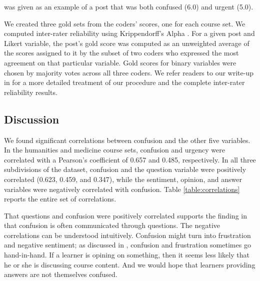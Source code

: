 \documentclass{edm_template}
\begin{document}
was given as an example of a post that was both confused (6.0) and urgent (5.0).

We created three gold sets from the coders' scores, one for each course set. We computed inter-rater reliability using Krippendorff's Alpha \cite{hayes2007answering}. For a given post and Likert variable, the post's gold score was computed as an unweighted average of the scores assigned to it by the subset of two coders who expressed the most agreement on that particular variable. Gold scores for binary variables were chosen by majority votes across all three coders. We refer readers to our write-up in \cite{stanfordMOOCPosts} for a more detailed treatment of our procedure and the complete inter-rater reliability results.


\subsection{Discussion}
We found significant correlations between confusion and the other five variables. In the humanities and medicine course sets, confusion and urgency were correlated with a Pearson's coefficient of 0.657 and 0.485, respectively. In all three subdivisions of the dataset, confusion and the question variable were positively correlated (0.623, 0.459, and 0.347), while the sentiment, opinion, and answer variables were negatively correlated with confusion. Table \ref{table:correlations} reports the entire set of correlations.

That questions and confusion were positively correlated supports the finding in \cite{wilson1989learning} that confusion is often communicated through questions. The negative correlations can be understood intuitively. Confusion might turn into frustration and negative sentiment; as discussed in \cite{liu2013sequences}, confusion and frustration sometimes go hand-in-hand. If a learner is opining on something, then it seems less likely that he or she is discussing course content. And we would hope that learners providing answers are not themselves confused.
\end{document}
